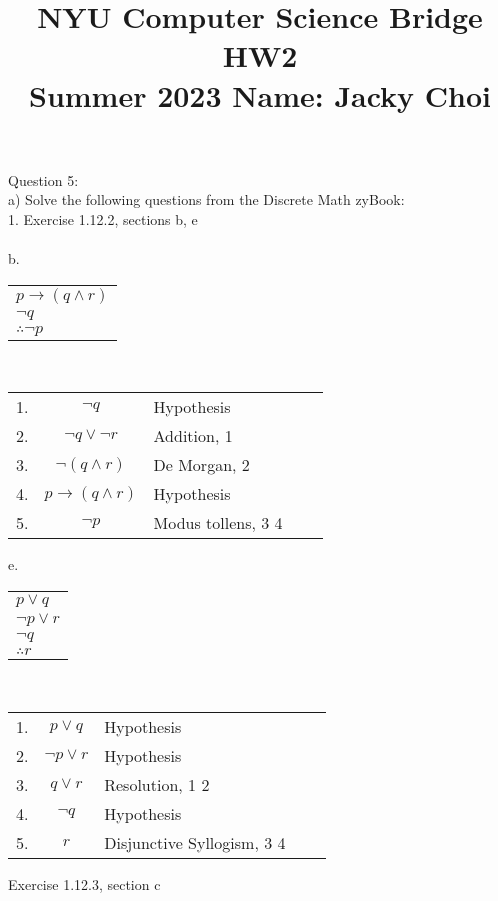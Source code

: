 \documentclass[11pt]{article}
\title{\textbf{NYU Computer Science Bridge HW2}\\
Summer 2023 Name: Jacky Choi}
\date{}
\begin{document}
\setul{}{2pt}

\maketitle

\noindent Question 5:\\
a) Solve the following questions from the Discrete Math zyBook:\\
1. Exercise 1.12.2, sections b, e\\\\
b. 
\begin{center}
  \begin{tabular}{l}
    $p \rightarrow (q \wedge r)$\\
  	$\neg q$\\
	\hline
   $ \therefore \neg p$\\
  \end{tabular} \\
 \begin{center}
  \begin{tabular}{lclcl}
1.& $\neg q$ & Hypothesis\\
2.& $\neg q \vee \neg r$ & Addition, 1\\
3.& $\neg (q \wedge r)$ & De Morgan, 2\\
4.& $ p \rightarrow (q \wedge r) $ & Hypothesis\\
5.& $\neg p$& Modus tollens, 3 4\\

  \end{tabular}
\end{center}
\end{center}

\noindent e. 
\begin{center}
  \begin{tabular}{l}
    $p \vee q$\\
  $ \neg p \vee r$\\
    $  \neg q$\\
    \hline
   $ \therefore r$\\
  \end{tabular}\\
  \begin{center}
   \begin{tabular}{lclcl}
1.& $p \vee q$ & Hypothesis\\
2.& $\neg p \vee r$ & Hypothesis\\
3.& $q \vee r$ &Resolution, 1 2\\
4.& $ \neg q$ & Hypothesis\\
5.& $r$& Disjunctive Syllogism, 3 4\\
  \end{tabular}
\end{center}
\end{center}
\pagebreak
\noindent Exercise 1.12.3, section c\\
\end{document}

